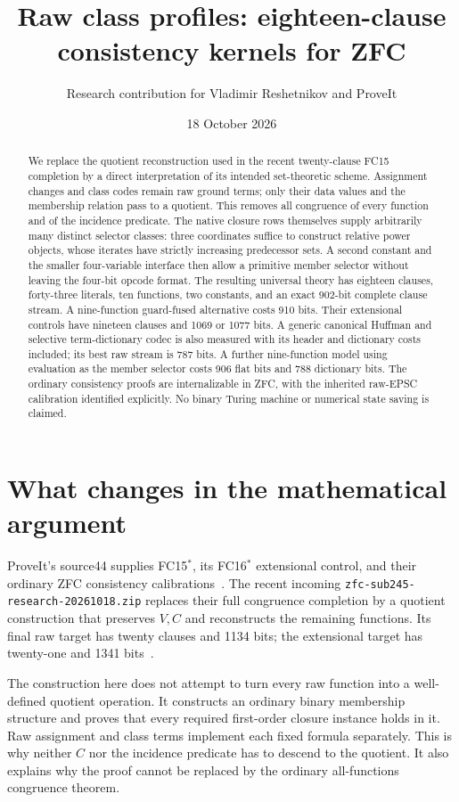 \documentclass[11pt]{article}
\title{Raw class profiles: eighteen-clause consistency kernels for ZFC}
\author{Research contribution for Vladimir Reshetnikov and ProveIt}
\date{18 October 2026}
\begin{document}
\maketitle
\begin{abstract}
We replace the quotient reconstruction used in the recent twenty-clause
FC15 completion by a direct interpretation of its intended set-theoretic
scheme. Assignment changes and class codes remain raw ground terms;
only their data values and the membership relation pass to a quotient.
This removes all congruence of every function and of the incidence
predicate. The native closure rows themselves supply arbitrarily many
distinct selector classes: three coordinates suffice to construct relative
power objects, whose iterates have strictly increasing predecessor sets.
A second
constant and the smaller four-variable interface then allow a primitive
member selector without leaving the four-bit opcode format. The resulting
universal theory has eighteen clauses, forty-three literals, ten functions,
two constants, and an exact 902-bit complete clause stream. A nine-function
guard-fused alternative costs 910 bits. Their extensional controls have
nineteen clauses and 1069 or 1077 bits. A generic canonical Huffman and
selective term-dictionary codec is also measured with its header and
dictionary costs included; its best raw stream is 787 bits. A further
nine-function model using evaluation as the member selector costs 906
flat bits and 788 dictionary bits. The ordinary consistency proofs are
internalizable in ZFC, with the inherited raw-EPSC calibration identified
explicitly. No binary Turing machine or numerical state saving is claimed.
\end{abstract}

\section{What changes in the mathematical argument}

ProveIt's source44 supplies FC15$^*$, its FC16$^*$ extensional control,
and their ordinary ZFC consistency calibrations~\cite{source44}. The recent incoming
\texttt{zfc-sub245-research-20261018.zip} replaces their full congruence
completion by a quotient construction that preserves $V,C$ and
reconstructs the remaining functions. Its final raw target has twenty
clauses and 1134 bits; the extensional target has twenty-one and 1341 bits~\cite{incoming20261018}.

The construction here does not attempt to turn every raw function into a
well-defined quotient operation. It constructs an ordinary binary
membership structure and proves that every required first-order closure
instance holds in it. Raw assignment and class terms implement each fixed
formula separately. This is why neither $C$ nor the incidence predicate
has to descend to the quotient. It also explains why the proof cannot be
replaced by the ordinary all-functions congruence theorem.
\end{document}
